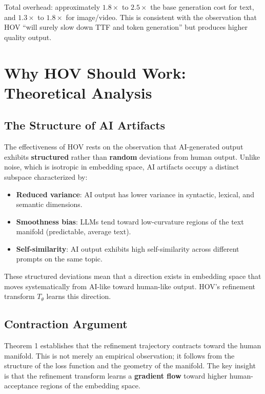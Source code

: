 \documentclass[12pt,oneside]{article}
\begin{document}
Total overhead: approximately $1.8 \times$ to $2.5 \times$ the base generation cost for text, and $1.3 \times$ to $1.8 \times$ for image/video. This is consistent with the observation that HOV ``will surely slow down TTF and token generation'' but produces higher quality output.

\section{Why HOV Should Work: Theoretical Analysis}

\subsection{The Structure of AI Artifacts}

The effectiveness of HOV rests on the observation that AI-generated output exhibits \textbf{structured} rather than \textbf{random} deviations from human output. Unlike noise, which is isotropic in embedding space, AI artifacts occupy a distinct subspace characterized by:
\begin{itemize}[noitemsep]
    \item \textbf{Reduced variance}: AI output has lower variance in syntactic, lexical, and semantic dimensions.
    \item \textbf{Smoothness bias}: LLMs tend toward low-curvature regions of the text manifold (predictable, average text).
    \item \textbf{Self-similarity}: AI output exhibits high self-similarity across different prompts on the same topic.
\end{itemize}

These structured deviations mean that a direction exists in embedding space that moves systematically from AI-like toward human-like output. HOV's refinement transform $T_\theta$ learns this direction.

\subsection{Contraction Argument}

Theorem 1 establishes that the refinement trajectory contracts toward the human manifold. This is not merely an empirical observation; it follows from the structure of the loss function and the geometry of the manifold. The key insight is that the refinement transform learns a \textbf{gradient flow} toward higher human-acceptance regions of the embedding space.
\end{document}
